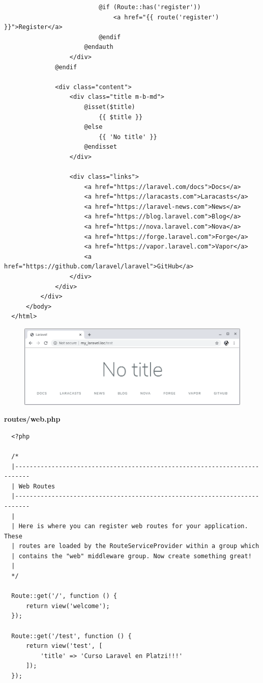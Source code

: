 \documentclass{article}
\begin{document}
\begin{verbatim}
                          @if (Route::has('register'))
                              <a href="{{ route('register') }}">Register</a>
                          @endif
                      @endauth
                  </div>
              @endif

              <div class="content">
                  <div class="title m-b-md">
                      @isset($title)
                          {{ $title }}
                      @else
                          {{ 'No title' }}
                      @endisset
                  </div>

                  <div class="links">
                      <a href="https://laravel.com/docs">Docs</a>
                      <a href="https://laracasts.com">Laracasts</a>
                      <a href="https://laravel-news.com">News</a>
                      <a href="https://blog.laravel.com">Blog</a>
                      <a href="https://nova.laravel.com">Nova</a>
                      <a href="https://forge.laravel.com">Forge</a>
                      <a href="https://vapor.laravel.com">Vapor</a>
                      <a href="https://github.com/laravel/laravel">GitHub</a>
                  </div>
              </div>
          </div>
      </body>
  </html>
\end{verbatim}

\begin{figure}[h!]
  \centering
  \includegraphics[scale=0.5]{./Pictures/008_blade.png}
\end{figure}

\textbf{routes/web.php}
\begin{verbatim}
  <?php

  /*
  |--------------------------------------------------------------------------
  | Web Routes
  |--------------------------------------------------------------------------
  |
  | Here is where you can register web routes for your application. These
  | routes are loaded by the RouteServiceProvider within a group which
  | contains the "web" middleware group. Now create something great!
  |
  */

  Route::get('/', function () {
      return view('welcome');
  });

  Route::get('/test', function () {
      return view('test', [
          'title' => 'Curso Laravel en Platzi!!!'
      ]);
  });
\end{verbatim}
\end{document}
